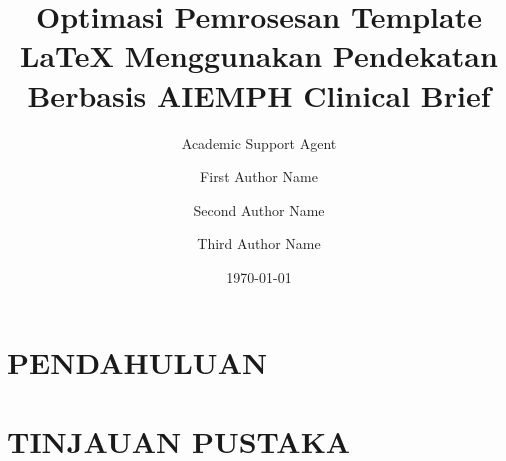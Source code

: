 \documentclass{wlemph}
\title{Optimasi Pemrosesan Template LaTeX Menggunakan Pendekatan Berbasis AI}
\author{Academic Support Agent}
\date{\today}
\begin{document}
\maketitle

\begin{abstract}

\end{abstract}

\chapter{PENDAHULUAN}


\chapter{TINJAUAN PUSTAKA}



\title{EMPH Clinical Brief}
\author[1]{First Author Name}
\author[2]{Second Author Name}
\author[3]{Third Author Name}
\end{document}
